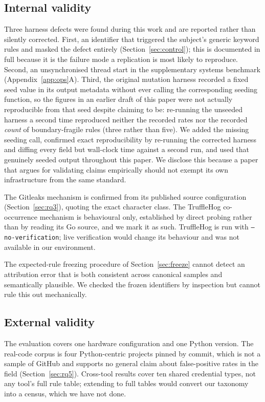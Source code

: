 \documentclass[journal]{IEEEtran}
\begin{document}
\subsection{Internal validity}

Three harness defects were found during this work and are reported rather than silently corrected. First, an identifier that triggered the subject's generic keyword rules and masked the defect entirely (Section~\ref{sec:control}); this is documented in full because it is the failure mode a replication is most likely to reproduce. Second, an unsynchronised thread start in the supplementary systems benchmark (Appendix~\ref{app:ops}A). Third, the original mutation harness recorded a fixed seed value in its output metadata without ever calling the corresponding seeding function, so the figures in an earlier draft of this paper were not actually reproducible from that seed despite claiming to be: re-running the unseeded harness a second time reproduced neither the recorded rates nor the recorded \emph{count} of boundary-fragile rules (three rather than five). We added the missing seeding call, confirmed exact reproducibility by re-running the corrected harness and diffing every field but wall-clock time against a second run, and used that genuinely seeded output throughout this paper. We disclose this because a paper that argues for validating claims empirically should not exempt its own infrastructure from the same standard.

The Gitleaks mechanism is confirmed from its published source configuration (Section~\ref{sec:rq3}), quoting the exact character class. The TruffleHog co-occurrence mechanism is behavioural only, established by direct probing rather than by reading its Go source, and we mark it as such. TruffleHog is run with \texttt{--no-verification}; live verification would change its behaviour and was not available in our environment.

The expected-rule freezing procedure of Section~\ref{sec:freeze} cannot detect an attribution error that is both consistent across canonical samples and semantically plausible. We checked the frozen identifiers by inspection but cannot rule this out mechanically.

\subsection{External validity}

The evaluation covers one hardware configuration and one Python version. The real-code corpus is four Python-centric projects pinned by commit, which is not a sample of GitHub and supports no general claim about false-positive rates in the field (Section~\ref{sec:rq5}). Cross-tool results cover ten shared credential types, not any tool's full rule table; extending to full tables would convert our taxonomy into a census, which we have not done.
\end{document}
